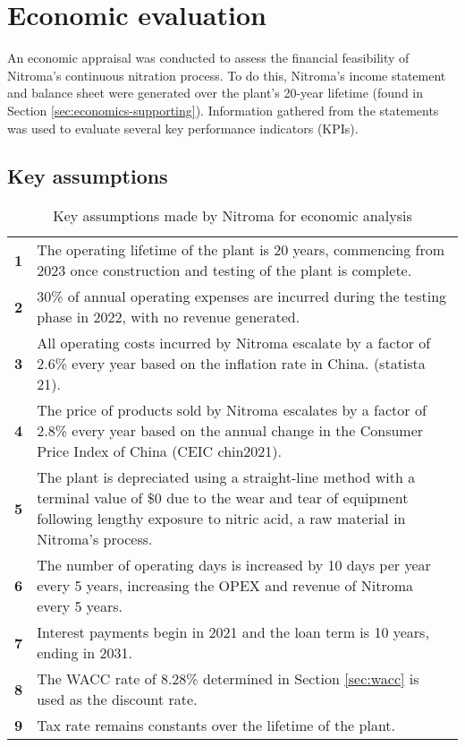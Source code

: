 \section{Economic evaluation}
An economic appraisal was conducted to assess the financial feasibility of Nitroma’s continuous nitration process. To do this, Nitroma’s income statement and balance sheet were generated over the plant’s 20-year lifetime (found in Section \ref{sec:economics-supporting}). Information gathered from the statements was used to evaluate several key performance indicators (KPIs).

\subsection{Key assumptions}

 \begin{table}[h]
    \vspace{-\intextsep}
    \centering
        \caption{Key assumptions made by Nitroma for economic analysis}
        \label{tab:assumptions-econ}
    \begin{tabular}{@{}lp{15cm}@{}}
    \toprule
   \textbf{1} & The operating lifetime of the plant is 20 years, commencing from 2023 once construction and testing of the plant is complete.   \\ 
   \textbf{2}      & 30\% of annual operating expenses are incurred during the testing phase in 2022, with no revenue generated.   \\
   \textbf{3}     & All operating costs incurred by Nitroma escalate by a factor of 2.6\% every year based on the inflation rate in China. (statista 21).   \\
   \textbf{4}                   & The price of products sold by Nitroma escalates by a factor of 2.8\% every year based on the annual change in the Consumer Price Index of China (CEIC chin2021).   \\
    \textbf{5}         & The plant is depreciated using a straight-line method with a terminal value of \$0 due to the wear and tear of equipment following lengthy exposure to nitric acid, a raw material in Nitroma's process.    \\ 
    \textbf{6} & The number of operating days is increased by 10 days per year every 5 years, increasing the OPEX and revenue of Nitroma every 5 years.\\
    \textbf{7} & Interest  payments begin in 2021 and the loan term is 10 years, ending in 2031. \\
    \textbf{8} & The WACC rate of 8.28\% determined in Section \ref{sec:wacc} is used as the discount rate. \\
    \textbf{9} & Tax rate remains constants over the lifetime of the plant. \\
  \bottomrule
    \end{tabular}
    \end{table}

